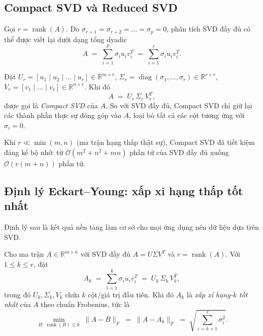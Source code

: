 \subsection{Compact SVD và Reduced SVD}\label{subsec:compact-svd}

Gọi $r = \operatorname{rank}(A)$. Do
$\sigma_{r+1} = \sigma_{r+2} = \dots = \sigma_p = 0$, phân tích SVD đầy đủ có
thể được viết lại dưới dạng tổng dyadic
\begin{equation}\label{eq:dyadic}
    A \;=\; \sum_{i=1}^{p}\sigma_i u_i v_i^T
       \;=\; \sum_{i=1}^{r}\sigma_i u_i v_i^T.
\end{equation}

\begin{definition}\label{def:compact-svd}
Đặt
$U_r = [u_1 \mid u_2 \mid \dots \mid u_r] \in \mathbb{R}^{m\times r}$,
$\Sigma_r = \operatorname{diag}(\sigma_1, \dots, \sigma_r) \in \mathbb{R}^{r\times r}$,
$V_r = [v_1 \mid \dots \mid v_r] \in \mathbb{R}^{n\times r}$. Khi đó
\[
    A \;=\; U_r\, \Sigma_r\, V_r^T,
\]
được gọi là \emph{Compact SVD} của $A$. So với SVD đầy đủ, Compact SVD chỉ
giữ lại các thành phần thực sự đóng góp vào $A$, loại bỏ tất cả các cột
tương ứng với $\sigma_i = 0$.
\end{definition}

Khi $r \ll \min(m, n)$ (ma trận hạng thấp thật sự), Compact SVD đã tiết kiệm
đáng kể bộ nhớ: từ $\mathcal{O}(m^2 + n^2 + mn)$ phần tử của SVD đầy đủ xuống
$\mathcal{O}(r(m + n))$ phần tử.

\subsection{Định lý Eckart--Young: xấp xỉ hạng thấp tốt nhất}\label{subsec:eckart-young}

Định lý sau là kết quả nền tảng làm cơ sở cho mọi ứng dụng nén dữ liệu dựa
trên SVD.

\begin{theorem}\label{thm:eckart-young}
Cho ma trận $A \in \mathbb{R}^{m\times n}$ với SVD đầy đủ $A = U\Sigma V^T$
và $r = \operatorname{rank}(A)$. Với $1 \le k \le r$, đặt
\begin{equation}\label{eq:Ak}
    A_k \;=\; \sum_{i=1}^{k}\sigma_i u_i v_i^T \;=\; U_k\, \Sigma_k\, V_k^T,
\end{equation}
trong đó $U_k, \Sigma_k, V_k$ chứa $k$ cột/giá trị đầu tiên. Khi đó $A_k$ là
\emph{xấp xỉ hạng-$k$ tốt nhất} của $A$ theo chuẩn Frobenius, tức là
\begin{equation}\label{eq:eckart-young}
    \min_{B:\ \operatorname{rank}(B)\le k}\; \|A - B\|_F
       \;=\; \|A - A_k\|_F
       \;=\; \sqrt{\sum_{i=k+1}^{r}\sigma_i^2}.
\end{equation}
\end{theorem}

